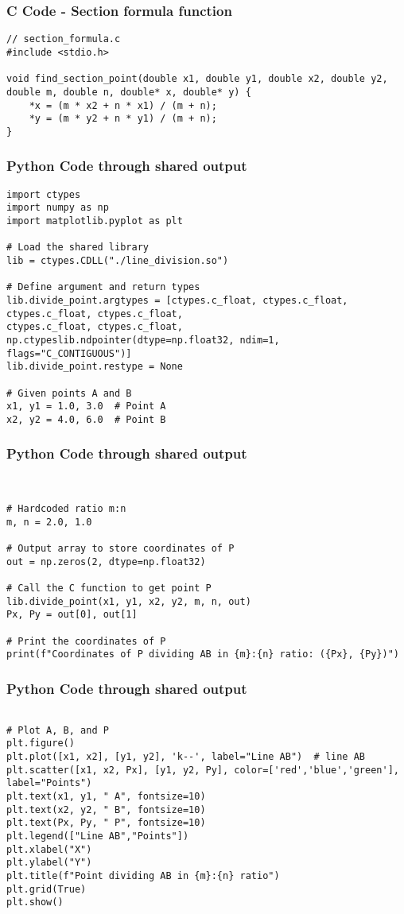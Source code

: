 \documentclass{beamer}
\begin{document}
	\begin{frame}[fragile]
		\frametitle{C Code - Section formula function }
		
		\begin{lstlisting}
// section_formula.c
#include <stdio.h>

void find_section_point(double x1, double y1, double x2, double y2, double m, double n, double* x, double* y) {
	*x = (m * x2 + n * x1) / (m + n);
	*y = (m * y2 + n * y1) / (m + n);
}
			\end{lstlisting}
		\end{frame}


\begin{frame}[fragile]
	\frametitle{Python Code through shared output}
	\begin{lstlisting}
import ctypes
import numpy as np
import matplotlib.pyplot as plt

# Load the shared library
lib = ctypes.CDLL("./line_division.so")

# Define argument and return types
lib.divide_point.argtypes = [ctypes.c_float, ctypes.c_float, ctypes.c_float, ctypes.c_float,
ctypes.c_float, ctypes.c_float,
np.ctypeslib.ndpointer(dtype=np.float32, ndim=1, flags="C_CONTIGUOUS")]
lib.divide_point.restype = None

# Given points A and B
x1, y1 = 1.0, 3.0  # Point A
x2, y2 = 4.0, 6.0  # Point B
	\end{lstlisting}
\end{frame}

\begin{frame}[fragile]
		\frametitle{Python Code through shared output}
\begin{lstlisting}
		
	
# Hardcoded ratio m:n
m, n = 2.0, 1.0

# Output array to store coordinates of P
out = np.zeros(2, dtype=np.float32)

# Call the C function to get point P
lib.divide_point(x1, y1, x2, y2, m, n, out)
Px, Py = out[0], out[1]

# Print the coordinates of P
print(f"Coordinates of P dividing AB in {m}:{n} ratio: ({Px}, {Py})")
	\end{lstlisting}
\end{frame}
\begin{frame}[fragile]
	\frametitle{Python Code through shared output}
	\begin{lstlisting}

# Plot A, B, and P
plt.figure()
plt.plot([x1, x2], [y1, y2], 'k--', label="Line AB")  # line AB
plt.scatter([x1, x2, Px], [y1, y2, Py], color=['red','blue','green'], label="Points")
plt.text(x1, y1, " A", fontsize=10)
plt.text(x2, y2, " B", fontsize=10)
plt.text(Px, Py, " P", fontsize=10)
plt.legend(["Line AB","Points"])
plt.xlabel("X")
plt.ylabel("Y")
plt.title(f"Point dividing AB in {m}:{n} ratio")
plt.grid(True)
plt.show()
\end{lstlisting}	
\end{frame}
\end{document}
